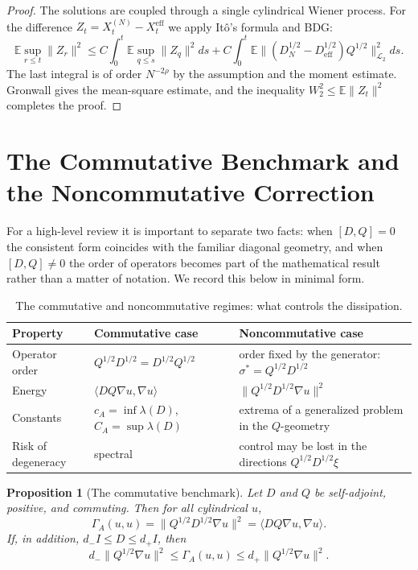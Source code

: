 \documentclass{article}
\newtheorem{proposition}[theorem]{Proposition}
\newcommand{\LLtwo}{\mathcal L_2}
\newcommand{\E}{\mathbb E}
\begin{document}
\begin{proof}
The solutions are coupled through a single cylindrical Wiener process. For the
difference \(Z_t=X_t^{(N)}-X_t^{\mathrm{eff}}\) we apply It\^o's formula and
BDG:
\[
        \E\sup_{r\le t}\|Z_r\|^2
        \le C\int_0^t\E\sup_{q\le s}\|Z_q\|^2ds
        +C\int_0^t\E\| (D_N^{1/2}-D_{\mathrm{eff}}^{1/2})Q^{1/2}\|_{\LLtwo}^2ds .
\]
The last integral is of order \(N^{-2\rho}\) by the assumption and the moment
estimate. Gronwall gives the mean-square estimate, and the inequality
\(W_2^2\le\E\|Z_t\|^2\) completes the proof.
\end{proof}

\section{The Commutative Benchmark and the Noncommutative Correction}
\label{sec:comm-noncomm}

For a high-level review it is important to separate two facts: when
\([D,Q]=0\) the consistent form coincides with the familiar diagonal
geometry, and when \([D,Q]\ne0\) the order of operators becomes part of the
mathematical result rather than a matter of notation. We record this below in
minimal form.


\begin{table}[h!]
\centering
\caption{The commutative and noncommutative regimes: what controls the dissipation.}
\label{tab:comm-noncomm-comparison}
\begin{tabular}{|p{}|p{}|p{}|}
\hline
Property & Commutative case & Noncommutative case \\
\hline
Operator order & \(Q^{1/2}D^{1/2}=D^{1/2}Q^{1/2}\) & order fixed by the generator: \(\sigma^*=Q^{1/2}D^{1/2}\) \\
\hline
Energy & \(\langle DQ\nabla u,\nabla u\rangle\) & \(\|Q^{1/2}D^{1/2}\nabla u\|^2\) \\
\hline
Constants & \(c_A=\inf\lambda(D)\), \(C_A=\sup\lambda(D)\) & extrema of a generalized problem in the \(Q\)-geometry \\
\hline
Risk of degeneracy & spectral & control may be lost in the directions \(Q^{1/2}D^{1/2}\xi\) \\
\hline
\end{tabular}
\end{table}

\begin{proposition}[The commutative benchmark]
\label{prop:commutative-benchmark}
Let \(D\) and \(Q\) be self-adjoint, positive, and commuting. Then for all
cylindrical \(u\),
\[
        \Gamma_A(u,u)
        =\|Q^{1/2}D^{1/2}\nabla u\|^2
        =\langle DQ\nabla u,\nabla u\rangle .
\]
If, in addition, \(d_-I\le D\le d_+I\), then
\[
        d_-\|Q^{1/2}\nabla u\|^2
        \le \Gamma_A(u,u)
        \le d_+\|Q^{1/2}\nabla u\|^2 .
\]
\end{proposition}
\end{document}
